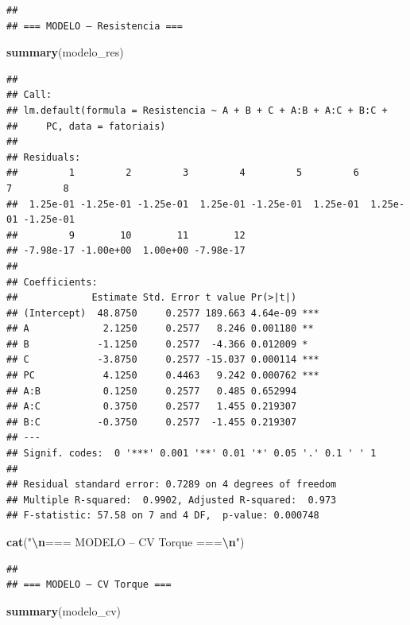 \documentclass[
]{article}
\newenvironment{Shaded}{\begin{snugshade}}{\end{snugshade}}
\newcommand{\FunctionTok}[1]{\textcolor[rgb]{0.13,0.29,0.53}{\textbf{#1}}}
\newcommand{\NormalTok}[1]{#1}
\newcommand{\SpecialCharTok}[1]{\textcolor[rgb]{0.81,0.36,0.00}{\textbf{#1}}}
\newcommand{\StringTok}[1]{\textcolor[rgb]{0.31,0.60,0.02}{#1}}
\begin{document}
\begin{verbatim}
## 
## === MODELO – Resistencia ===
\end{verbatim}

\begin{Shaded}
\begin{Highlighting}[]
\FunctionTok{summary}\NormalTok{(modelo\_res)}
\end{Highlighting}
\end{Shaded}

\begin{verbatim}
## 
## Call:
## lm.default(formula = Resistencia ~ A + B + C + A:B + A:C + B:C + 
##     PC, data = fatoriais)
## 
## Residuals:
##         1         2         3         4         5         6         7         8 
##  1.25e-01 -1.25e-01 -1.25e-01  1.25e-01 -1.25e-01  1.25e-01  1.25e-01 -1.25e-01 
##         9        10        11        12 
## -7.98e-17 -1.00e+00  1.00e+00 -7.98e-17 
## 
## Coefficients:
##             Estimate Std. Error t value Pr(>|t|)    
## (Intercept)  48.8750     0.2577 189.663 4.64e-09 ***
## A             2.1250     0.2577   8.246 0.001180 ** 
## B            -1.1250     0.2577  -4.366 0.012009 *  
## C            -3.8750     0.2577 -15.037 0.000114 ***
## PC            4.1250     0.4463   9.242 0.000762 ***
## A:B           0.1250     0.2577   0.485 0.652994    
## A:C           0.3750     0.2577   1.455 0.219307    
## B:C          -0.3750     0.2577  -1.455 0.219307    
## ---
## Signif. codes:  0 '***' 0.001 '**' 0.01 '*' 0.05 '.' 0.1 ' ' 1
## 
## Residual standard error: 0.7289 on 4 degrees of freedom
## Multiple R-squared:  0.9902, Adjusted R-squared:  0.973 
## F-statistic: 57.58 on 7 and 4 DF,  p-value: 0.000748
\end{verbatim}

\begin{Shaded}
\begin{Highlighting}[]
\FunctionTok{cat}\NormalTok{(}\StringTok{"}\SpecialCharTok{\textbackslash{}n}\StringTok{=== MODELO – CV Torque ===}\SpecialCharTok{\textbackslash{}n}\StringTok{"}\NormalTok{)}
\end{Highlighting}
\end{Shaded}

\begin{verbatim}
## 
## === MODELO – CV Torque ===
\end{verbatim}

\begin{Shaded}
\begin{Highlighting}[]
\FunctionTok{summary}\NormalTok{(modelo\_cv)}
\end{Highlighting}
\end{Shaded}
\end{document}
